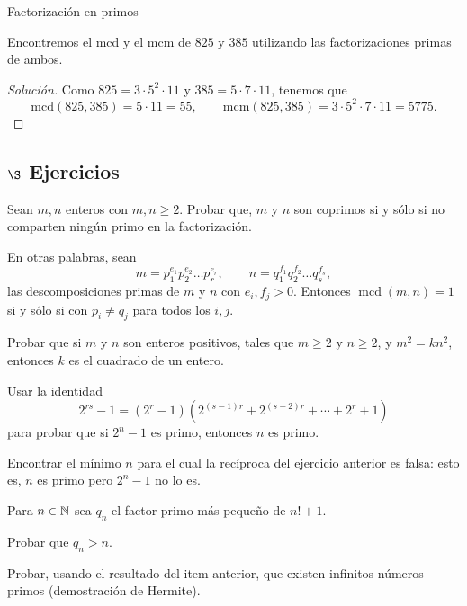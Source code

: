 \begin{section}{Factorización en primos}
\begin{ejemplo*}
Encontremos el mcd y el mcm  de $825$ y $385$ utilizando las factorizaciones primas de ambos.
\begin{proof}[Solución]
    Como $825 =  3\cdot 5^2\cdot 11$ y $385 = 5\cdot 7\cdot 11$, tenemos que
    $$
    \text{mcd}(825,385) = 5\cdot 11 = 55, \qquad \text{mcm}(825,385) = 3\cdot 5^2\cdot 7\cdot 11 = 5775.
    $$
\end{proof}
\end{ejemplo*}



\subsection*{$\S$ Ejercicios}

\begin{enumex}
    \item Sean $m,n$ enteros con $m,n\ge 2$. Probar que,  $m$ y  $n$ son coprimos si y sólo si no comparten ningún primo en la factorización. 
    
    En otras palabras, sean  
    $$
    m=p_1^{e_1}p_2^{e_2}\ldots p_r^{e_r},\qquad
    n=q_1^{f_1}q_2^{f_2}\ldots q_s^{f_s},
    $$ 
    las descomposiciones primas de $m$ y $n$ con $e_i,f_j > 0$. Entonces  $\operatorname{mcd}(m,n) =1$ si y sólo si con $p_i \not= q_j$ para todos los $i,j$.  
    
\item Probar que si $m$ y $n$ son enteros positivos, tales que $m\ge 2$ y $n \ge 2$, y
$m^2 = kn^2$, entonces $k$ es el cuadrado de un entero.

\item Usar la identidad
$$
2^{rs} -1 = (2^r-1) (2^{(s-1)r}+2^{(s-2)r}+\cdots +2^r+1)
$$
para probar que si $2^n-1$ es primo, entonces $n$ es primo.

\item Encontrar el mínimo $n$ para el cual la recíproca del ejercicio anterior
es falsa: esto es, $n$ es primo pero $2^n-1$ no lo es.

\item Para $n \in \mathbb N$ sea $q_n$ el factor primo más pequeño de $n! + 1$. 
    \begin{enumex}
        \item Probar que $q_n >n$.
        \item Probar, usando el resultado del item anterior, que existen infinitos números primos (demostración de Hermite). 
    \end{enumex}
\end{enumex}

\end{section}    
    

